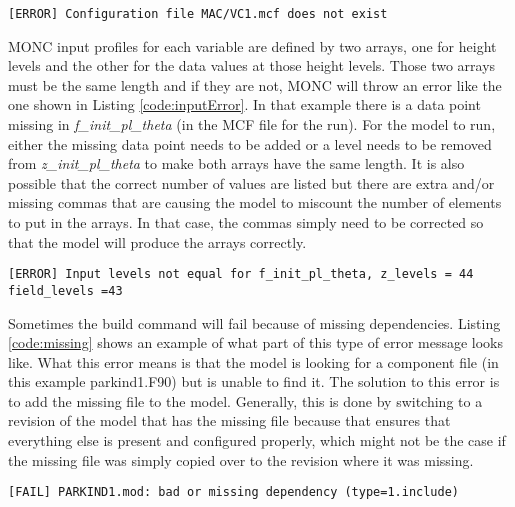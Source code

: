 \begin{lstlisting}[caption={Example of missing configuration file error message.},label={code:misConf}]
[ERROR] Configuration file MAC/VC1.mcf does not exist	
\end{lstlisting}

MONC input profiles for each variable are defined by two arrays, one for height levels and the other for the data values at those height levels. Those two arrays must be the same length and if they are not, MONC will throw an error like the one shown in Listing \ref{code:inputError}. In that example there is a data point missing in \textit{f\_init\_pl\_theta} (in the MCF file for the run). For the model to run, either the missing data point needs to be added or a level needs to be removed from \textit{z\_init\_pl\_theta} to make both arrays have the same length. It is also possible that the correct number of values are listed but there are extra and/or missing commas that are causing the model to miscount the number of elements to put in the arrays. In that case, the commas simply need to be corrected so that the model will produce the arrays correctly.
\newpage
\begin{lstlisting}[caption={Example of uneven input profile error message. In this case there are more height levels defined than the associated data points, so the model crashes because the number of height levels and data points must be the same.},label={code:inputError}]
[ERROR] Input levels not equal for f_init_pl_theta, z_levels = 44 field_levels =43
\end{lstlisting}

Sometimes the build command will fail because of missing dependencies. Listing \ref{code:missing} shows an example of what part of this type of error message looks like. What this error means is that the model is looking for a component file (in this example parkind1.F90) but is unable to find it. The solution to this error is to add the missing file to the model. Generally, this is done by switching to a revision of the model that has the missing file because that ensures that everything else is present and configured properly, which might not be the case if the missing file was simply copied over to the revision where it was missing.

\begin{lstlisting}[caption={Example of a missing dependency error that can be thrown while attempting to build MONC.},label={code:missing},belowskip=-1cm]
[FAIL] PARKIND1.mod: bad or missing dependency (type=1.include)
\end{lstlisting}


